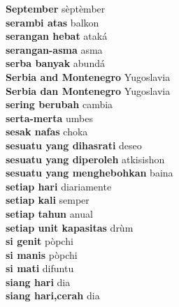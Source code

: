 \textbf{ September  } sèptèmber \\
\textbf{ serambi atas  } balkon \\
\textbf{ serangan hebat  } ataká \\
\textbf{ serangan-asma  } asma \\
\textbf{ serba banyak  } abundá \\
\textbf{ Serbia and Montenegro  } Yugoslavia \\
\textbf{ Serbia dan Montenegro  } Yugoslavia \\
\textbf{ sering berubah  } cambia \\
\textbf{ serta-merta  } umbes \\
\textbf{ sesak nafas  } choka \\
\textbf{ sesuatu yang dihasrati  } deseo \\
\textbf{ sesuatu yang diperoleh  } atkisishon \\
\textbf{ sesuatu yang menghebohkan  } baina \\
\textbf{ setiap hari  } diariamente \\
\textbf{ setiap kali  } semper \\
\textbf{ setiap tahun  } anual \\
\textbf{ setiap unit kapasitas  } drùm \\
\textbf{ si genit  } pòpchi \\
\textbf{ si manis  } pòpchi \\
\textbf{ si mati  } difuntu \\
\textbf{ siang hari  } dia \\
\textbf{ siang hari,cerah  } dia \\
